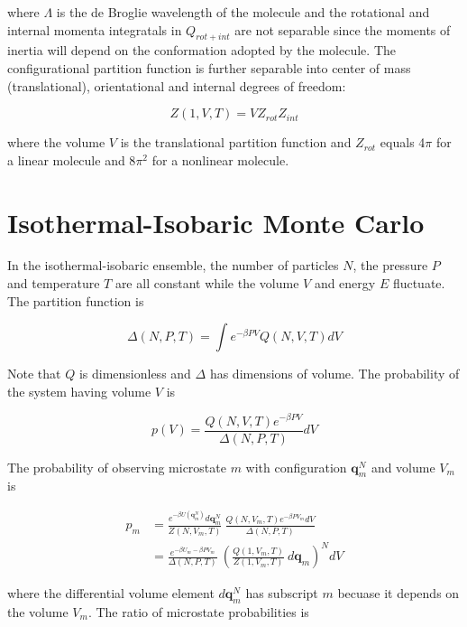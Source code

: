 where $\Lambda$ is the de Broglie wavelength of the molecule and the rotational and internal momenta integratals in $Q_{rot+int}$ are not separable since the moments of inertia will depend on the conformation adopted by the molecule. The configurational partition function is further separable into center of mass (translational), orientational and internal degrees of freedom:

\begin{equation}
\label{eq:configPartitionFn_1VT}
Z(1,V,T) = VZ_{rot}Z_{int}
\end{equation}

where the volume $V$ is the translational partition function and $Z_{rot}$ equals 4$\pi$ for a linear molecule and 8$\pi^2$ for a nonlinear molecule.

\section{Isothermal-Isobaric Monte Carlo}
\label{sec:NPT}
In the isothermal-isobaric ensemble, the number of particles $N$, the pressure $P$ and temperature $T$ are all constant while the volume $V$ and energy $E$ fluctuate. The partition function is

\begin{equation}
\label{eq:partitionFn_NPT}
\Delta(N,P,T) = \int e^{-\beta P V} Q(N,V,T) dV
\end{equation}

Note that $Q$ is dimensionless and $\Delta$ has dimensions of volume. The probability of the system having volume $V$ is 

\begin{equation}
\label{eq:pV}
p(V) = \frac{Q(N,V,T)e^{-\beta P V}}{\Delta(N,P,T)}dV
\end{equation}

The probability of observing microstate $m$ with configuration $\mathbf{q}_m^N$ and volume $V_m$ is

\begin{align}
\label{eq:pNPT}
p_m &= \frac{e^{-\beta U(\mathbf{q}_m^N)}d\mathbf{q}_m^N}{Z(N,V_m,T)}\ \frac{Q(N,V_m,T) e^{-\beta P V_m} dV}{\Delta(N,P,T)} \nonumber \\
&= \frac{e^{-\beta U_m - \beta P V_m}}{\Delta(N,P,T)}\ \left(\frac{Q(1,V_m,T)}{Z(1,V_m,T)}\ d\mathbf{q}_m\right)^N dV
\end{align}

where the differential volume element $d\mathbf{q}_m^N$ has subscript $m$ becuase it depends on the volume $V_m$. The ratio of microstate probabilities is

